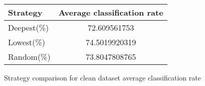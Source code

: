 \begin{figure}[h]
 \begin{center}
  \caption{Strategy comparison for clean dataset average classification rate}
   \begin{tabular}{ | l || c | }
    \hline
	 Strategy & Average classification rate \\ \hline \hline
        Deepest(\%) &72.609561753 \\ \hline
        Lowest(\%) & 74.5019920319 \\ \hline
        Random(\%) & 73.8047808765 \\ \hline
    \end{tabular}
    \label{fig:averageClassificationRate}
\end{center}
\end{figure}



